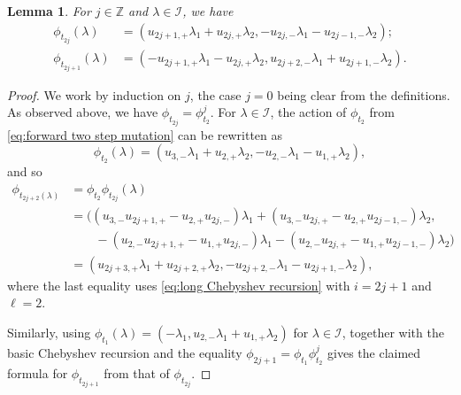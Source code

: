 \documentclass{amsart}
\newtheorem{lemma}[theorem]{Lemma}
\numberwithin{theorem}{section}
\newcommand{\cI}{\mathcal{I}}
\newcommand{\ZZ}{\mathbb{Z}}
\begin{document}
  \begin{lemma}
    \label{le:imaginary transformations}
    For $j\in\ZZ$ and $\lambda\in\cI$, we have
    \begin{align*}
      \phi_{t_{2j}}(\lambda)&=(u_{2j+1,+}\lambda_1+u_{2j,+}\lambda_2,-u_{2j,-}\lambda_1-u_{2j-1,-}\lambda_2);\\
      \phi_{t_{2j+1}}(\lambda)&=(-u_{2j+1,+}\lambda_1-u_{2j,+}\lambda_2,u_{2j+2,-}\lambda_1+u_{2j+1,-}\lambda_2).
    \end{align*}
  \end{lemma}
  \begin{proof}
    We work by induction on $j$, the case $j=0$ being clear from the definitions.
    As observed above, we have $\phi_{t_{2j}}=\phi_{t_2}^j$.
    For $\lambda\in\cI$, the action of $\phi_{t_2}$ from \eqref{eq:forward two step mutation} can be rewritten as
    \[\phi_{t_2}(\lambda)=(u_{3,-}\lambda_1+u_{2,+}\lambda_2,-u_{2,-}\lambda_1-u_{1,+}\lambda_2),\]
    and so
    \begin{align*}
      \phi_{t_{2j+2}(\lambda)}&=\phi_{t_2}\phi_{t_{2j}}(\lambda)\\
      &=\big( (u_{3,-}u_{2j+1,+}-u_{2,+}u_{2j,-})\lambda_1+(u_{3,-}u_{2j,+}-u_{2,+}u_{2j-1,-})\lambda_2,\\
      &\qquad -(u_{2,-}u_{2j+1,+}-u_{1,+}u_{2j,-})\lambda_1-(u_{2,-}u_{2j,+}-u_{1,+}u_{2j-1,-})\lambda_2 \big)\\
      &=(u_{2j+3,+}\lambda_1+u_{2j+2,+}\lambda_2, -u_{2j+2,-}\lambda_1-u_{2j+1,-}\lambda_2),
    \end{align*}
    where the last equality uses \eqref{eq:long Chebyshev recursion} with $i=2j+1$ and $\ell=2$.

    Similarly, using $\phi_{t_1}(\lambda)=(-\lambda_1,u_{2,-}\lambda_1+u_{1,+}\lambda_2)$ for $\lambda\in\cI$, together with the basic Chebyshev recursion and the equality $\phi_{2j+1}=\phi_{t_1}\phi_{t_2}^j$ gives the claimed formula for $\phi_{t_{2j+1}}$ from that of $\phi_{t_{2j}}$.
  \end{proof}
\end{document}
